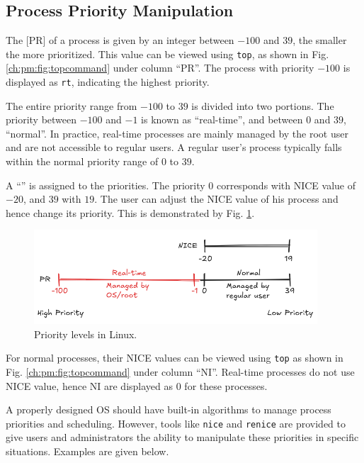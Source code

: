 \subsection{Process Priority Manipulation}

The [PR] of a process is given by an integer between $-100$ and $39$, the smaller the more prioritized. This value can be viewed using \verb|top|, as shown in Fig. \ref{ch:pm:fig:topcommand} under column ``PR''. The process with priority $-100$ is displayed as \verb|rt|, indicating the highest priority.

The entire priority range from $-100$ to $39$ is divided into two portions. The priority between $-100$ and $-1$ is known as ``real-time'', and between $0$ and $39$, ``normal''. In practice, real-time processes are mainly managed by the root user and are not accessible to regular users. A regular user's process typically falls within the normal priority range of $0$ to $39$. 

A ``'' is assigned to the priorities. The priority $0$ corresponds with NICE value of $-20$, and $39$ with $19$. The user can adjust the NICE value of his process and hence change its priority. This is demonstrated by Fig. \ref{ch:pm:fig:priority}.

\begin{figure}[htbp]
	\centering
	\includegraphics[width=300pt]{chapters/part-1/figures/priority.png}
	\caption{Priority levels in Linux.} \label{ch:pm:fig:priority}
\end{figure}

For normal processes, their NICE values can be viewed using \verb|top| as shown in Fig. \ref{ch:pm:fig:topcommand} under column ``NI''. Real-time processes do not use NICE value, hence NI are displayed as $0$ for these processes.

A properly designed OS should have built-in algorithms to manage process priorities and scheduling. However, tools like \verb|nice| and \verb|renice| are provided to give users and administrators the ability to manipulate these priorities in specific situations. Examples are given below.

